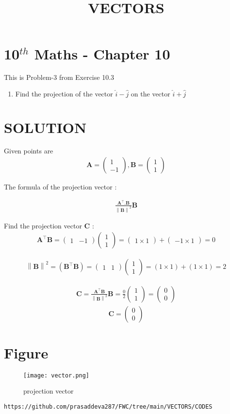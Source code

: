 \documentclass[12pt]{article}
\newcommand{\myvec}[1]{\ensuremath{\begin{pmatrix}#1\end{pmatrix}}}
\providecommand{\norm}[1]{\left\lVert#1\right\rVert}
\let\vec\mathbf
\begin{document}
\begin{center}
\title{\textbf{VECTORS}}
\date{\vspace{-5ex}} %
\maketitle
\end{center}

\setcounter{page}{1}

\section{10$^{th}$ Maths - Chapter 10}

This is Problem-3 from Exercise 10.3

\begin{enumerate}
\item Find the projection of the vector $\hat{i}-\hat{j}$ on the vector $\hat{i}+\hat{j}$  
\end{enumerate}
\section{SOLUTION}
Given points are
\begin{align}
 \vec{A}=\myvec{1\\ -1} ,
 \vec{B}=\myvec{1\\ 1}
\end{align}

The formula of the projection vector :
 
\begin{align}
	\frac{\vec{A}^\top.\vec{B}}{\norm{\vec{B}}^2} \vec{B}
\end{align}

Find the projection vector $\vec{C}$ :
\begin{align}
	\vec{A}^\top \vec{B} = \myvec{1 &-1} \myvec{1\\ 1}=\myvec{1 \times 1}+\myvec{-1 \times  1}=0
\end{align}

\begin{align}
	\norm {\vec {B}}^2 = (\vec{B}^\top  \vec{B})=\myvec{1 & 1} \myvec{1\\ 1}= (1 \times  1)+(1 \times  1)=2
\end{align}

\begin{align}
\vec{C} = 
	\frac{\vec{A}^\top  \vec{B}}{\norm {\vec{B}}^2} \vec{B}
   =\frac{0}{2} \myvec{1\\ 1}
	=\myvec{0\\ 0}
\end{align}
\begin{align}
	\vec{C}=\myvec{0\\ 0}
\end{align}

\pagebreak\section{Figure}
\begin{figure}[h]
\texttt{[image: vector.png]}
\caption{projection vector}
		\label{fig:Figure}
\end{figure}
\begin{lstlisting}
https://github.com/prasaddeva287/FWC/tree/main/VECTORS/CODES
\end{lstlisting}
\end{document}

